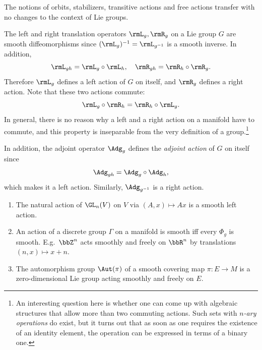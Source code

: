 The notions of orbits, stabilizers, transitive actions and free actions transfer with no changes to the context of Lie groups.

\begin{example}
    The left and right translation operators $\rmL_g,\rmR_g$ on a Lie group $G$ are smooth diffeomorphisms since $(\rmL_g)^{-1}=\rmL_{g^{-1}}$ is a smooth inverse. In addition,
    \[\rmL_{gh}=\rmL_g\circ \rmL_h,\quad \rmR_{gh}=\rmR_h\circ \rmR_g.\]
    Therefore $\rmL_g$ defines a left action of $G$ on itself, and $\rmR_g$ defines a right action. Note that these two actions commute: 
    \[\rmL_g\circ \rmR_h=\rmR_h\circ \rmL_g.\]
    In general, there is no reason why a left and a right action on a manifold have to commute, and this property is inseparable from the very definition of a group.\footnote{An interesting question here is whether one can come up with algebraic structures that allow more than two commuting actions. Such sets with \emph{$n$-ary operations} do exist, but it turns out that as soon as one requires the existence of an identity element, the operation can be expressed in terms of a binary one.}

    In addition, the adjoint operator $\Adg_g$ defines the \emph{adjoint action} of $G$ on itself since 
    \[\Adg_{gh}=\Adg_g\circ \Adg_h,\]
    which makes it a left action. Similarly, $\Adg_{g^{-1}}$ is a right action.
\end{example}

\begin{example}
    \begin{enumerate}[label=(\alph*)]
        \item The natural action of $\GL_n(V)$ on $V$ via $(A,x)\mapsto Ax$ is a smooth left action.
        \item An action of a discrete group $\Gamma$ on a manifold is smooth iff every $\Phi_g$ is smooth. E.g.~$\bbZ^n$ acts smoothly and freely on $\bbR^n$ by translations $(n,x)\mapsto x+n$.
        \item The automorphism group $\Aut(\pi)$ of a smooth covering map $\pi:E\to M$ is a zero-dimensional Lie group acting smoothly and freely on $E$.
    \end{enumerate}
\end{example}

